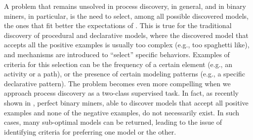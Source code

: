 A problem that remains unsolved in process discovery, in general, and in binary miners, in particular, is the need to select, among all possible discovered models, the ones that fit better the expectations of . This is true for the traditional discovery of procedural and declarative models, where the discovered model that accepts all the positive examples is usually too complex (e.g., too spaghetti like), and mechanisms are introduced to ``select'' specific behaviors. Examples of criteria for this selection can be the frequency of a certain element (e.g., an activity or a path), or the presence of certain modeling patterns (e.g., a specific declarative pattern).   
The problem becomes even more compelling when we approach process discovery as a two-class supervised task. In fact, as recently shown in \cite{DBLP:conf/bpm/SlaatsDB21}, perfect binary miners, able to discover models that accept all positive examples and none of the negative examples, do not necessarily exist. In such cases, many sub-optimal models can be returned, leading to the issue of identifying criteria for preferring one model or the other.
 
